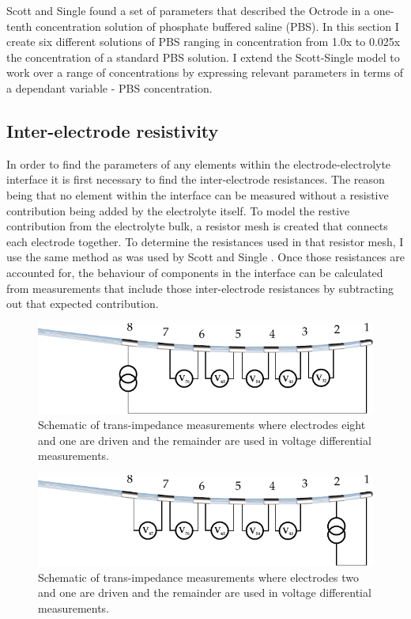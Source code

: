   Scott and Single found a set of parameters that described the Octrode in a one-tenth concentration solution of phosphate buffered saline (PBS).
  In this section I create six different solutions of PBS ranging in concentration from 1.0x to 0.025x the concentration of a standard PBS solution.
  I extend the Scott-Single model to work over a range of concentrations by expressing relevant parameters in terms of a dependant variable - PBS concentration.


  \subsection{Inter-electrode resistivity}


    In order to find the parameters of any elements within the electrode-electrolyte interface it is first necessary to find the inter-electrode resistances.
    The reason being that no element within the interface can be measured without a resistive contribution being added by the electrolyte itself.
    To model the restive contribution from the electrolyte bulk, a resistor mesh is created that connects each electrode together.
    To determine the resistances used in that resistor mesh, I use the same method as was used by Scott and Single \cite{Scott2014}.
    Once those resistances are accounted for, the behaviour of components in the interface can be calculated from measurements that include those inter-electrode resistances by subtracting out that expected contribution.

    \begin{figure}
      \centering
      \includegraphics{content/pt2/07-InterfaceModel/graphics/TransimpedanceMeasurements_Stim81}
      \caption{\label{fig:pt2-transimpedanceMeasurementDiagram_81Stim}Schematic of trans-impedance measurements where electrodes eight and one are driven and the remainder are used in voltage differential measurements.}
    \end{figure}

    \begin{figure}
      \centering
      \includegraphics{content/pt2/07-InterfaceModel/graphics/TransimpedanceMeasurements_Stim21}
      \caption{\label{fig:pt2-transimpedanceMeasurementDiagram_21Stim}Schematic of trans-impedance measurements where electrodes two and one are driven and the remainder are used in voltage differential measurements.}
    \end{figure}

